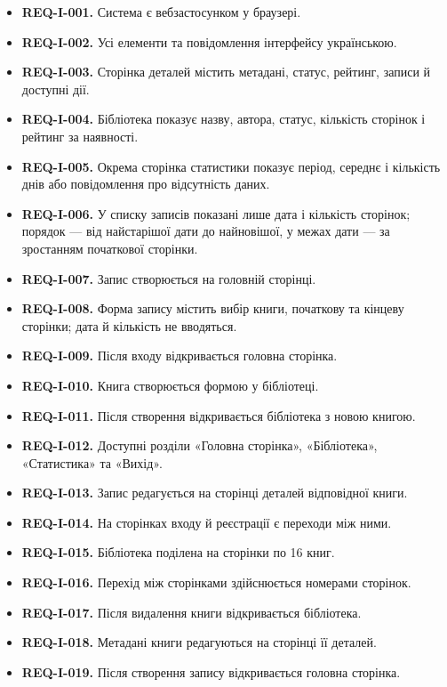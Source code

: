 \documentclass[
]{article}
\providecommand{\tightlist}{%
  \setlength{\itemsep}{0pt}\setlength{\parskip}{0pt}}
\begin{document}
\begin{itemize}
\tightlist
\item
  \textbf{REQ-I-001.} Система є вебзастосунком у браузері.
\item
  \textbf{REQ-I-002.} Усі елементи та повідомлення інтерфейсу
  українською.
\item
  \textbf{REQ-I-003.} Сторінка деталей містить метадані, статус,
  рейтинг, записи й доступні дії.
\item
  \textbf{REQ-I-004.} Бібліотека показує назву, автора, статус,
  кількість сторінок і рейтинг за наявності.
\item
  \textbf{REQ-I-005.} Окрема сторінка статистики показує період, середнє
  і кількість днів або повідомлення про відсутність даних.
\item
  \textbf{REQ-I-006.} У списку записів показані лише дата і кількість
  сторінок; порядок --- від найстарішої дати до найновішої, у межах дати
  --- за зростанням початкової сторінки.
\item
  \textbf{REQ-I-007.} Запис створюється на головній сторінці.
\item
  \textbf{REQ-I-008.} Форма запису містить вибір книги, початкову та
  кінцеву сторінки; дата й кількість не вводяться.
\item
  \textbf{REQ-I-009.} Після входу відкривається головна сторінка.
\item
  \textbf{REQ-I-010.} Книга створюється формою у бібліотеці.
\item
  \textbf{REQ-I-011.} Після створення відкривається бібліотека з новою
  книгою.
\item
  \textbf{REQ-I-012.} Доступні розділи «Головна сторінка», «Бібліотека»,
  «Статистика» та «Вихід».
\item
  \textbf{REQ-I-013.} Запис редагується на сторінці деталей відповідної
  книги.
\item
  \textbf{REQ-I-014.} На сторінках входу й реєстрації є переходи між
  ними.
\item
  \textbf{REQ-I-015.} Бібліотека поділена на сторінки по 16 книг.
\item
  \textbf{REQ-I-016.} Перехід між сторінками здійснюється номерами
  сторінок.
\item
  \textbf{REQ-I-017.} Після видалення книги відкривається бібліотека.
\item
  \textbf{REQ-I-018.} Метадані книги редагуються на сторінці її деталей.
\item
  \textbf{REQ-I-019.} Після створення запису відкривається головна
  сторінка.
\end{itemize}
\end{document}
